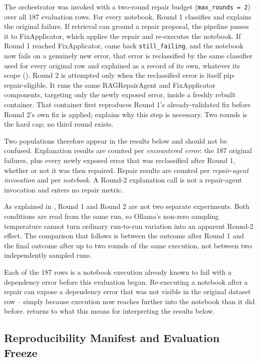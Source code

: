The orchestrator was invoked with a two-round repair budget
(\texttt{max\_rounds = 2}) over all 187 evaluation rows. For every notebook, 
Round 1 classifies and explains the original failure. 
If retrieval can ground a repair proposal, the pipeline passes it to 
FixApplicator, which applies the repair and re-executes the notebook. If Round 1 reached
FixApplicator, came back \texttt{still\_failing}, and the notebook now
fails on a genuinely new error, that error is reclassified by the same
classifier used for every original row and explained as a record of its
own, whatever its scope (). Round 2 is
attempted only when the reclassified error is itself pip-repair-eligible.
It runs the same RAGRepairAgent and FixApplicator components, targeting
only the newly exposed error, inside a freshly rebuilt container. That
container first reproduces Round 1's already-validated fix before Round
2's own fix is applied;  explains why this
step is necessary. Two rounds is the hard cap; no third round exists.

Two populations therefore appear in the results below and should not be
confused. Explanation results are counted per \emph{encountered error}:
the 187 original failures, plus every newly exposed error that was
reclassified after Round 1, whether or not it was then repaired. Repair
results are counted per \emph{repair-agent invocation} and per
\emph{notebook}. A Round-2 explanation call is not a repair-agent
invocation and enters no repair metric.

As explained in , Round 1 and Round 2 are not two
separate experiments. Both conditions are read from the same run, so
Ollama's non-zero sampling temperature cannot turn ordinary run-to-run
variation into an apparent Round-2 effect. The comparison that follows is
between the outcome after Round 1 and the final outcome after up to two
rounds of the same execution, not between two independently sampled
runs.

Each of the 187 rows is a notebook execution already known to fail with
a dependency error before this evaluation began. Re-executing a notebook
after a repair can expose a dependency error that was not visible in the
original dataset row -- simply because execution now reaches further
into the notebook than it did before. 
returns to what this means for interpreting the results below.

\subsection{Reproducibility Manifest and Evaluation Freeze}
\label{sec:v-final-manifest}

